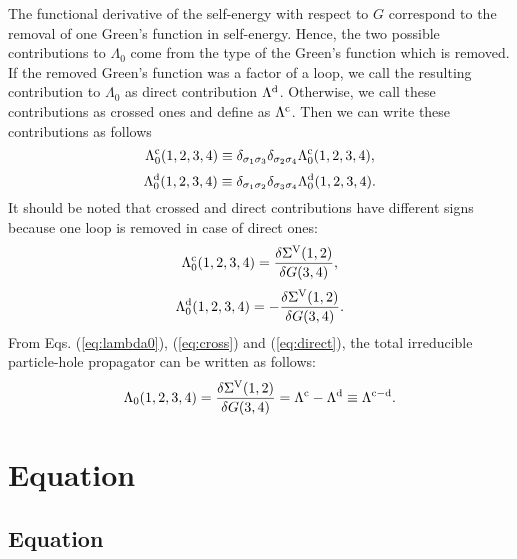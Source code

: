 The functional derivative of the self-energy with respect to $G$ 
correspond to the removal of one Green's function in self-energy. 
Hence, the two possible contributions to $\Lambda_0$ come from
the type of the Green's function which is removed.
If the removed Green's function was a factor of a loop, we call
the resulting contribution to $\Lambda_0$ as direct contribution $\Lambda^{\rm d}$.
Otherwise, we call these contributions as crossed ones and define as $\Lambda^{\rm c}$.
Then we can write these contributions as follows
%
\begin{equation}
	\Lambda^{\rm c}_0(1,2,3,4) \equiv \delta_{\sigma_1\sigma_3}
	\delta_{\sigma_2\sigma_4}\Lambda^{\rm c}_0(1,2,3,4),
	\label{eq:defcross}
\end{equation}
%
\begin{equation}
	\Lambda^{\rm d}_0(1,2,3,4) \equiv \delta_{\sigma_1\sigma_2}
	\delta_{\sigma_3\sigma_4}\Lambda^{\rm d}_0(1,2,3,4).
	\label{eq:defdirect}
\end{equation}
%
It should be noted that crossed and direct contributions have different 
signs because one loop is removed in case of direct ones:
%
\begin{equation}
	\Lambda^{\rm c}_0(1,2,3,4) = \frac{\delta\Sigma^{\rm V}(1,2)}
	{\delta G(3,4)}, 
	\label{eq:cross}
\end{equation}
%
\begin{equation}
	\Lambda^{\rm d}_0(1,2,3,4) = -\frac{\delta\Sigma^{\rm V}(1,2)}
	{\delta G(3,4)}.
	\label{eq:direct}
\end{equation}
%
From Eqs. (\ref{eq:lambda0}), (\ref{eq:cross}) and (\ref{eq:direct}), 
the total irreducible particle-hole propagator can be written as follows:
%
\begin{equation}
	\Lambda_0(1,2,3,4) = \frac{\delta\Sigma^{\rm V}(1,2)}{\delta G(3,4)}
	= \Lambda^{\rm c} - \Lambda^{\rm d} \equiv \Lambda^{{\rm c} - {\rm d}}.
	\label{eq:lambdadiff}
\end{equation}
%

\section{Equation}\label{sec:method_model}
\subsection{Equation}\label{sec:method_model_model}	


